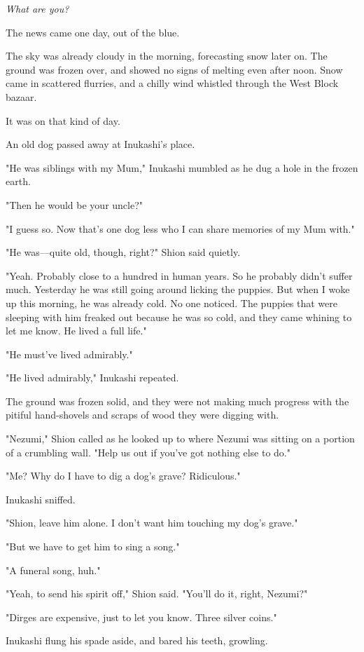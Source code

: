 \emph{What are you?}

\mybreak

The news came one day, out of the blue.

The sky was already cloudy in the morning, forecasting snow later on.
The ground was frozen over, and showed no signs of melting even after
noon. Snow came in scattered flurries, and a chilly wind whistled
through the West Block bazaar.

It was on that kind of day.

An old dog passed away at Inukashi's place.

"He was siblings with my Mum," Inukashi mumbled as he dug a hole in the
frozen earth.

"Then he would be your uncle?"

"I guess so. Now that's one dog less who I can share memories of my Mum
with."

"He was---quite old, though, right?" Shion said quietly.

"Yeah. Probably close to a hundred in human years. So he probably didn't
suffer much. Yesterday he was still going around licking the puppies.
But when I woke up this morning, he was already cold. No one noticed.
The puppies that were sleeping with him freaked out because he was so
cold, and they came whining to let me know. He lived a full life."

"He must've lived admirably."

"He lived admirably," Inukashi repeated.

The ground was frozen solid, and they were not making much progress with
the pitiful hand-shovels and scraps of wood they were digging with.

"Nezumi," Shion called as he looked up to where Nezumi was sitting on a
portion of a crumbling wall. "Help us out if you've got nothing else to
do."

"Me? Why do I have to dig a dog's grave? Ridiculous."

Inukashi sniffed.

"Shion, leave him alone. I don't want him touching my dog's grave."

"But we have to get him to sing a song."

"A funeral song, huh."

"Yeah, to send his spirit off," Shion said. "You'll do it, right,
Nezumi?"

"Dirges are expensive, just to let you know. Three silver coins."

Inukashi flung his spade aside, and bared his teeth, growling.

